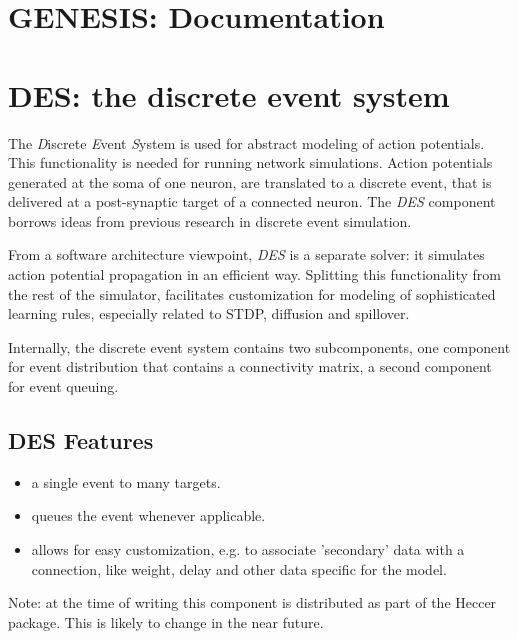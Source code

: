 \documentclass[12pt]{article}
\begin{document}
\section*{GENESIS: Documentation}

\section*{DES: the discrete event system}

The {\it D}iscrete {\it E}vent {\it S}ystem is used for abstract
modeling of action potentials. This functionality is needed for
running network simulations. Action potentials generated at the soma
of one neuron, are translated to a discrete event, that is delivered
at a post-synaptic target of a connected neuron. The {\it DES}
component borrows ideas from previous research in discrete event
simulation.

From a software architecture viewpoint, {\it DES} is a separate
solver: it simulates action potential propagation in an efficient way.
Splitting this functionality from the rest of the simulator,
facilitates customization for modeling of sophisticated learning
rules, especially related to STDP, diffusion and spillover.

Internally, the discrete event system contains two subcomponents, one
component for event distribution that contains a connectivity matrix,
a second component for event queuing.

\subsection*{DES Features}

\begin{itemize}
\item a single event to many targets.
\item queues the event whenever applicable.
\item allows for easy customization, e.g. to associate 'secondary'
  data with a connection, like weight, delay and other data specific
  for the model.
\end{itemize}

Note: at the time of writing this component is distributed as part of the Heccer package. This is likely to change in the near future. 
\end{document}
